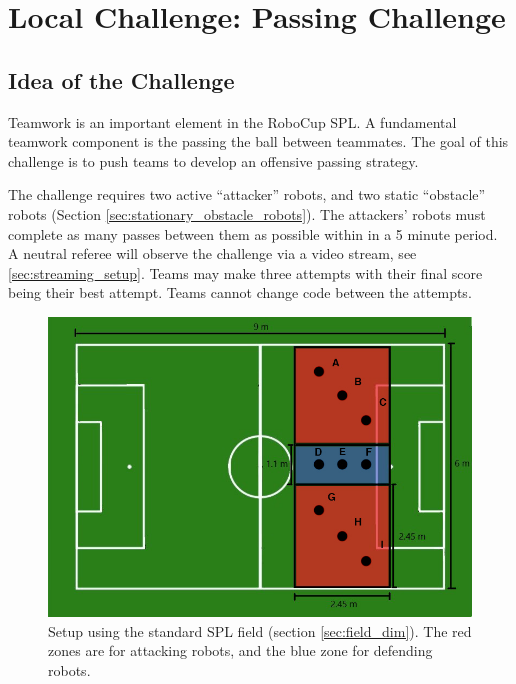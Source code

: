 \section{Local Challenge: Passing Challenge}
\label{sec:PassingChallenge}

\subsection{Idea of the Challenge}
Teamwork is an important element in the RoboCup SPL. A fundamental teamwork component is the passing the ball between teammates. The goal of this challenge is to push teams to develop an offensive passing strategy. 

The challenge requires two active ``attacker'' robots, and two static ``obstacle'' robots (\cf Section \ref{sec:stationary_obstacle_robots}). The attackers' robots must complete as many passes between them as possible within in a 5 minute period.
A neutral referee will observe the challenge via a video stream, see \ref{sec:streaming_setup}.
Teams may make three attempts with their final score being their best attempt. Teams cannot change code between the attempts.
\begin{figure}[ht]
\includegraphics[width=0.95\linewidth]{figs/ch_2_full.jpg}
\caption{Setup using the standard SPL field (\cf section \ref{sec:field_dim}). The red zones are for attacking robots, and the blue zone for defending robots. }
\label{ch2:zone96}
\centering
\end{figure}

